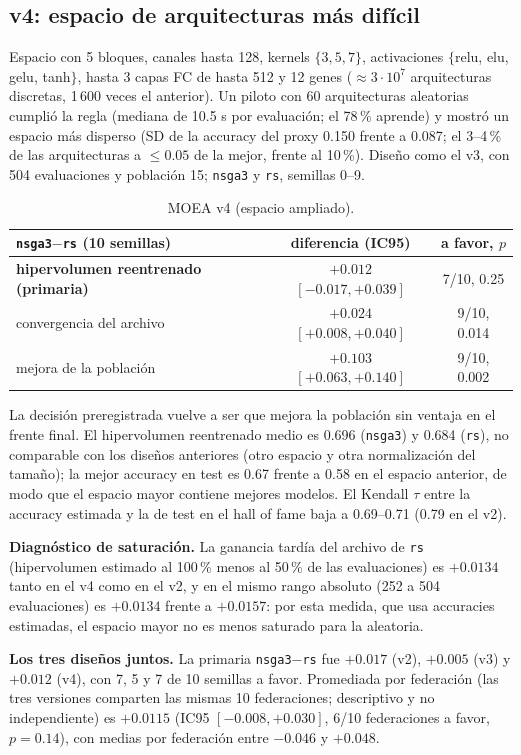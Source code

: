 \documentclass[11pt,a4paper]{article}
\begin{document}
\subsection*{v4: espacio de arquitecturas más difícil}
Espacio con 5 bloques, canales hasta 128, kernels $\{3,5,7\}$, activaciones $\{$relu, elu, gelu, tanh$\}$, hasta 3 capas FC de hasta 512 y 12 genes ($\approx3\cdot10^{7}$ arquitecturas discretas, 1\,600 veces el anterior). Un piloto con 60 arquitecturas aleatorias cumplió la regla (mediana de 10.5 s por evaluación; el 78\,\% aprende) y mostró un espacio más disperso (SD de la accuracy del proxy 0.150 frente a 0.087; el 3--4\,\% de las arquitecturas a $\le0.05$ de la mejor, frente al 10\,\%). Diseño como el v3, con 504 evaluaciones y población 15; \texttt{nsga3} y \texttt{rs}, semillas 0--9.
\begin{table}[h]
\centering\small
\begin{tabular}{lcc}
\toprule
\texttt{nsga3}$-$\texttt{rs} (10 semillas) & diferencia (IC95) & a favor, $p$\\
\midrule
\textbf{hipervolumen reentrenado (primaria)} & $+0.012$ $[-0.017,+0.039]$ & 7/10, 0.25\\
convergencia del archivo & $+0.024$ $[+0.008,+0.040]$ & 9/10, 0.014\\
mejora de la población & $+0.103$ $[+0.063,+0.140]$ & 9/10, 0.002\\
\bottomrule
\end{tabular}
\caption{MOEA v4 (espacio ampliado).}
\label{tab:v4}
\end{table}
La decisión preregistrada vuelve a ser que mejora la población sin ventaja en el frente final. El hipervolumen reentrenado medio es 0.696 (\texttt{nsga3}) y 0.684 (\texttt{rs}), no comparable con los diseños anteriores (otro espacio y otra normalización del tamaño); la mejor accuracy en test es 0.67 frente a 0.58 en el espacio anterior, de modo que el espacio mayor contiene mejores modelos. El Kendall $\tau$ entre la accuracy estimada y la de test en el hall of fame baja a 0.69--0.71 (0.79 en el v2).

\textbf{Diagnóstico de saturación.} La ganancia tardía del archivo de \texttt{rs} (hipervolumen estimado al 100\,\% menos al 50\,\% de las evaluaciones) es $+0.0134$ tanto en el v4 como en el v2, y en el mismo rango absoluto (252 a 504 evaluaciones) es $+0.0134$ frente a $+0.0157$: por esta medida, que usa accuracies estimadas, el espacio mayor no es menos saturado para la aleatoria.

\textbf{Los tres diseños juntos.} La primaria \texttt{nsga3}$-$\texttt{rs} fue $+0.017$ (v2), $+0.005$ (v3) y $+0.012$ (v4), con 7, 5 y 7 de 10 semillas a favor. Promediada por federación (las tres versiones comparten las mismas 10 federaciones; descriptivo y no independiente) es $+0.0115$ (IC95 $[-0.008,+0.030]$, 6/10 federaciones a favor, $p=0.14$), con medias por federación entre $-0.046$ y $+0.048$.
\end{document}
